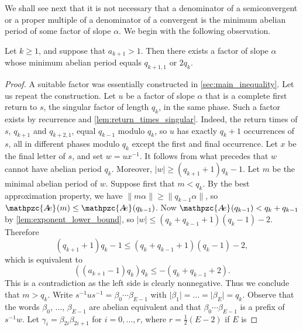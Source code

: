 \documentclass[a4paper,fleqn]{article}
\providecommand{\abs}[1]{\lvert#1\rvert}
\providecommand{\norm}[1]{\lVert#1\rVert}
\newcommand{\abexp}[2][]{\mathpzc{A\mkern-3mu e}_{#1}(#2)}
\begin{document}
  We shall see next that it is not necessary that a denominator of a semiconvergent or a proper multiple of a denominator
  of a convergent is the minimum abelian period of some factor of slope $\alpha$. We begin with the following
  observation.

  \begin{proposition}\label{prp:fibonacci_counter_example}
    Let $k \geq 1$, and suppose that $a_{k+1} > 1$. Then there exists a factor of slope $\alpha$ whose minimum abelian
    period equals $q_{k+1,1}$ or $2q_k$.
  \end{proposition}
  \begin{proof}
    A suitable factor was essentially constructed in \autoref{sec:main_inequality}. Let us repeat the construction.
    Let $u$ be a factor of slope $\alpha$ that is a complete first return to $s$, the singular factor of length $q_k$,
    in the same phase. Such a factor exists by recurrence and \autoref{lem:return_times_singular}. Indeed, the return
    times of $s$, $q_{k+1}$ and $q_{k+2,1}$, equal $q_{k-1}$ modulo $q_k$, so $u$ has exactly $q_k + 1$ occurrences of
    $s$, all in different phases modulo $q_k$ except the first and final occurrence. Let $x$ be the final letter of
    $s$, and set $w = ux^{-1}$. It follows from what precedes that $w$ cannot have abelian period $q_k$. Moreover,
    $\abs{w} \geq (q_{k+1} + 1)q_k - 1$. Let $m$ be the minimal abelian period of $w$. Suppose first that $m < q_k$. By
    the best approximation property, we have $\norm{m\alpha} \geq \norm{q_{k-1}\alpha}$, so
    $\abexp{m} \leq \abexp{q_{k-1}}$. Now $\abexp{q_{k-1}} < q_k + q_{k-1}$ by \autoref{lem:exponent_lower_bound}, so
    $\abs{w} \leq (q_k + q_{k-1} + 1)(q_k - 1) - 2$. Therefore
    \begin{equation*}
      (q_{k+1} + 1)q_k - 1 \leq (q_k + q_{k-1} + 1)(q_k - 1) - 2,
    \end{equation*}
    which is equivalent to
    \begin{equation*}
      ((a_{k+1} - 1)q_k)q_k \leq -(q_k + q_{k-1} + 2).
    \end{equation*}
    This is a contradiction as the left side is clearly nonnegative. Thus we conclude that $m > q_k$. Write
    $s^{-1}us^{-1} = \beta_0 \dotsm \beta_{E-1}$ with $\abs{\beta_1} = \ldots = \abs{\beta_E} = q_k$. Observe that the
    words $\beta_0$, $\ldots$, $\beta_{E-1}$ are abelian equivalent and that $\beta_0 \dotsm \beta_{E-1}$ is a prefix
    of $s^{-1}w$. Let $\gamma_i = \beta_{2i}\beta_{2i+1}$ for $i = 0, \ldots, r$, where $r = \tfrac12(E - 2)$ if $E$ is

\end{proof}
\end{document}
